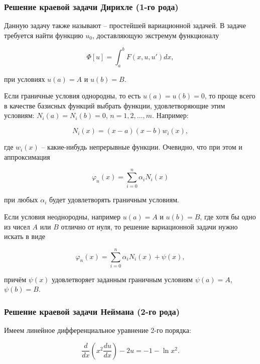 \documentclass{article}
\begin{document}
\subsubsection{Решение краевой задачи Дирихле (1-го рода)}

Данную задачу также называют -- простейшей вариационной задачей. В задаче требуется найти функцию $u_{0}$, доставляющую экстремум функционалу

\begin{displaymath}
	\Phi[u] = \int_{a}^{b} F(x, u, u')dx,
\end{displaymath}

\noindent при условиях $u(a) = A$ и $u(b) = B$.

Если граничные условия однородны, то есть $u(a) = u(b) = 0$, то проще всего в качестве базисных функций выбрать функции, удовлетворяющие этим условиям: $N_{i}(a) = N_{i}(b) = 0$, $n = 1, 2, \ldots, m$. Например:

\begin{displaymath}
	N_{i}(x) = (x-a)(x-b)w_{i}(x),
\end{displaymath}

\noindent где $w_{i}(x)$ -- какие-нибудь непрерывные функции. Очевидно, что при этом и аппроксимация 

\begin{displaymath}
	\varphi_{n}(x) = \sum_{i=0}^n \alpha_{i}N_{i}(x)
\end{displaymath}

\noindent при любых $\alpha_{i}$ будет удовлетворять граничным условиям.

Если условия неоднородны, например $u(a) = A$ и $u(b) = B$, где хотя бы одно из чисел $A$ или $B$ отлично от нуля, то решение вариационной задачи нужно искать в виде

\begin{equation}\label{equation_solve_var_rank_2}
	\varphi_{n}(x) = \sum_{i=0}^n \alpha_{i}N_{i}(x) + \psi(x),
\end{equation}

\noindent причём $\psi(x)$ удовлетворяет заданным граничным условиям $\psi(a) = A$, $\psi(b) = B$.

\subsubsection{Решение краевой задачи Неймана (2-го рода)}

Имеем линейное дифференциальное уравнение 2-го порядка:

\begin{displaymath}
	\frac{d}{dx} \left( x^2 \frac{d u}{dx} \right) - 2u = -1 - \ln{x^2}.
\end{displaymath}
\end{document}
